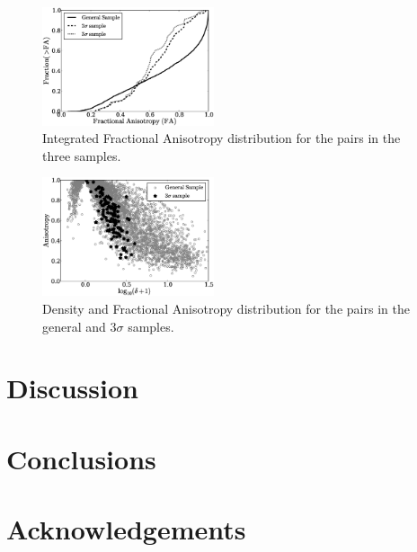 \documentclass{emulateapj}
\begin{document}
\begin{figure}
\begin{center}
  \includegraphics[width=0.45\textwidth]{FA_histogram.eps}
\end{center}
\caption{Integrated Fractional Anisotropy distribution for the pairs in the three samples.
    \label{fig:FA}}  
\end{figure}

\begin{figure}
\begin{center}
  \includegraphics[width=0.45\textwidth]{FA_delta_scatter.eps}
\end{center}
\caption{Density and Fractional Anisotropy distribution for the pairs in the general and $3\sigma$ samples.
    \label{fig:FA}}  
\end{figure}

\section{Discussion}
\label{sec:discussion}

\section{Conclusions}
\label{sec:conclusions}


\section*{Acknowledgements}


 
\end{document}
